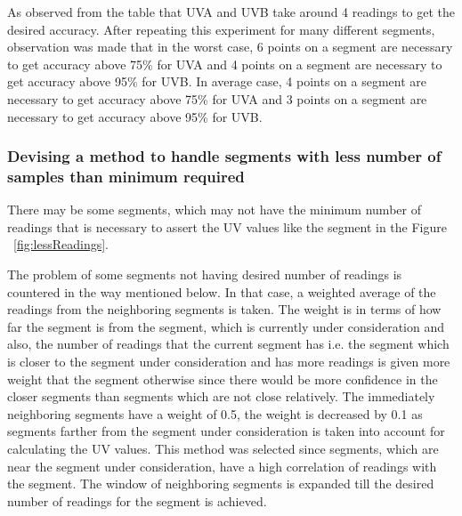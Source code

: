 \documentclass[10pt]{sigplan-proc-varsize}
\begin{document}
As observed from the table that UVA and UVB take around 4 readings to get the desired accuracy. After repeating this experiment for many different segments, observation was made that in the worst case, 6 points on a segment are necessary to get accuracy above 75\% for UVA and 4 points on a segment are necessary to get accuracy above 95\% for UVB.
In average case, 4 points on a segment are necessary to get accuracy above 75\% for UVA and  3 points on a segment are necessary to get accuracy above 95\% for UVB.


\subsubsection{Devising a method to handle segments with less number of samples than minimum required}
There may be some segments, which may not have the minimum number of readings that is necessary to assert the UV values like the segment in the Figure ~\ref{fig:lessReadings}. 

The problem of some segments not having desired number of readings is countered in the way mentioned below. In that case, a weighted average of the readings from the neighboring segments is taken. The weight is in terms of how far the segment is from the segment, which is currently under consideration and also, the number of readings that the current segment has i.e. the segment which is closer to the segment under consideration and has more readings is given more weight that the segment otherwise since there would be more confidence in the closer segments than segments which are not close relatively. The immediately neighboring segments have a weight of 0.5, the weight is decreased by 0.1 as segments farther from the segment under consideration is taken into account for calculating the UV values. This method was selected since segments, which are near the segment under consideration, have a high correlation of readings with the segment. The window of neighboring segments is expanded till the desired number of readings for the segment is achieved. 
\end{document}
